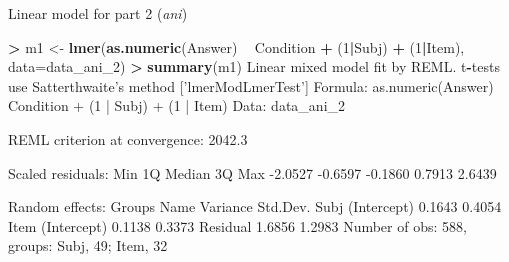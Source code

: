 \documentclass[ignorenonframetext,]{beamer}
\newenvironment{Shaded}{\begin{snugshade}}{\end{snugshade}}
\newcommand{\KeywordTok}[1]{\textcolor[rgb]{0.13,0.29,0.53}{\textbf{#1}}}
\newcommand{\DataTypeTok}[1]{\textcolor[rgb]{0.13,0.29,0.53}{#1}}
\newcommand{\DecValTok}[1]{\textcolor[rgb]{0.00,0.00,0.81}{#1}}
\newcommand{\StringTok}[1]{\textcolor[rgb]{0.31,0.60,0.02}{#1}}
\newcommand{\OperatorTok}[1]{\textcolor[rgb]{0.81,0.36,0.00}{\textbf{#1}}}
\newcommand{\NormalTok}[1]{#1}
\begin{document}
\begin{frame}{Linear model for part 2
(\emph{ani})}

\tiny

\begin{Shaded}
\begin{Highlighting}[]
\OperatorTok{>}\StringTok{ }\NormalTok{m1 <-}\StringTok{ }\KeywordTok{lmer}\NormalTok{(}\KeywordTok{as.numeric}\NormalTok{(Answer) }\OperatorTok{~}\StringTok{ }\NormalTok{Condition }\OperatorTok{+}\StringTok{ }\NormalTok{(}\DecValTok{1}\OperatorTok{|}\NormalTok{Subj) }\OperatorTok{+}\StringTok{ }\NormalTok{(}\DecValTok{1}\OperatorTok{|}\NormalTok{Item), }\DataTypeTok{data=}\NormalTok{data_ani_}\DecValTok{2}\NormalTok{)}
\OperatorTok{>}\StringTok{ }\KeywordTok{summary}\NormalTok{(m1)}
\NormalTok{Linear mixed model fit by REML. t}\OperatorTok{-}\NormalTok{tests use Satterthwaite}\StringTok{'s method ['}\NormalTok{lmerModLmerTest}\StringTok{']}
\StringTok{Formula: as.numeric(Answer) ~ Condition + (1 | Subj) + (1 | Item)}
\StringTok{   Data: data_ani_2}

\StringTok{REML criterion at convergence: 2042.3}

\StringTok{Scaled residuals: }
\StringTok{    Min      1Q  Median      3Q     Max }
\StringTok{-2.0527 -0.6597 -0.1860  0.7913  2.6439 }

\StringTok{Random effects:}
\StringTok{ Groups   Name        Variance Std.Dev.}
\StringTok{ Subj     (Intercept) 0.1643   0.4054  }
\StringTok{ Item     (Intercept) 0.1138   0.3373  }
\StringTok{ Residual             1.6856   1.2983  }
\StringTok{Number of obs: 588, groups:  Subj, 49; Item, 32}
\end{Highlighting}
\end{Shaded}

\end{frame}
\end{document}
